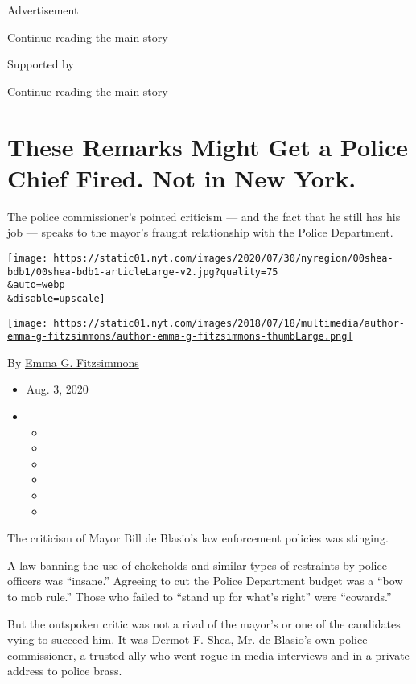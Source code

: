 Advertisement

\protect\hyperlink{after-top}{Continue reading the main story}

Supported by

\protect\hyperlink{after-sponsor}{Continue reading the main story}

\hypertarget{these-remarks-might-get-a-police-chief-fired-not-in-new-york}{%
\section{These Remarks Might Get a Police Chief Fired. Not in New
York.}\label{these-remarks-might-get-a-police-chief-fired-not-in-new-york}}

The police commissioner's pointed criticism --- and the fact that he
still has his job --- speaks to the mayor's fraught relationship with
the Police Department.

\texttt{[image: https://static01.nyt.com/images/2020/07/30/nyregion/00shea-bdb1/00shea-bdb1-articleLarge-v2.jpg?quality=75\\\&auto=webp\\\&disable=upscale]}

\href{https://www.nytimes.com/by/emma-g-fitzsimmons}{\texttt{[image: https://static01.nyt.com/images/2018/07/18/multimedia/author-emma-g-fitzsimmons/author-emma-g-fitzsimmons-thumbLarge.png]}}

By \href{https://www.nytimes.com/by/emma-g-fitzsimmons}{Emma G.
Fitzsimmons}

\begin{itemize}
\item
  Aug. 3, 2020
\item
  \begin{itemize}
  \item
  \item
  \item
  \item
  \item
  \item
  \end{itemize}
\end{itemize}

The criticism of Mayor Bill de Blasio's law enforcement policies was
stinging.

A law banning the use of chokeholds and similar types of restraints by
police officers was ``insane.'' Agreeing to cut the Police Department
budget was a ``bow to mob rule.'' Those who failed to ``stand up for
what's right'' were ``cowards.''

But the outspoken critic was not a rival of the mayor's or one of the
candidates vying to succeed him. It was Dermot F. Shea, Mr. de Blasio's
own police commissioner, a trusted ally who went rogue in media
interviews and in a private address to police brass.

